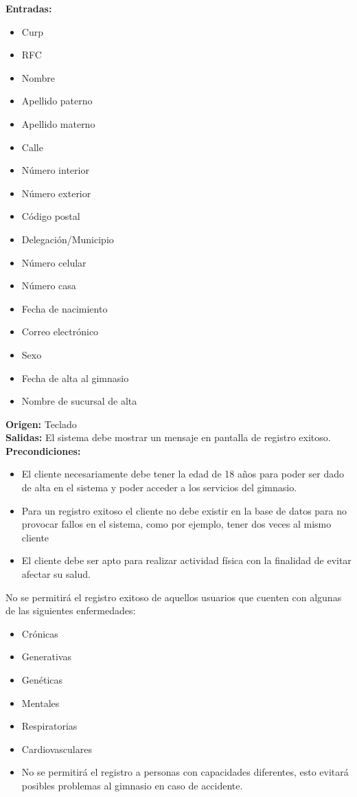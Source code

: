 \textbf{Entradas:}
\begin{itemize}
	\item Curp
	\item RFC
	\item Nombre
	\item Apellido paterno
	\item Apellido materno
	\item Calle 
	\item Número interior
	\item Número exterior
	\item Código postal
	\item Delegación/Municipio
	\item Número celular
	\item Número casa
	\item Fecha de nacimiento
	\item Correo electrónico
	\item Sexo
	\item Fecha de alta al gimnasio
	\item Nombre de sucursal de alta 
\end{itemize}
\textbf{Origen:} Teclado\\
\textbf{Salidas:} El sistema debe mostrar un mensaje en pantalla de registro exitoso.\\
\textbf{Precondiciones:}
\begin{itemize}
	\item El cliente necesariamente debe tener la edad de 18 años para poder ser dado de alta en el sistema y poder acceder a los servicios del gimnasio.
	\item Para un registro exitoso el cliente no debe existir en la base de datos para no provocar fallos en el sistema, como por ejemplo, tener dos veces al mismo cliente
	\item El cliente debe ser apto para realizar actividad física con la finalidad de evitar  afectar su salud.
\end{itemize}
No se permitirá el registro exitoso de aquellos usuarios que cuenten con algunas de  las siguientes enfermedades: \\
\begin{itemize}
	\item Crónicas
	\item Generativas
	\item Genéticas
	\item Mentales
	\item Respiratorias
	\item Cardiovasculares
	\item No se permitirá el registro a personas con capacidades diferentes, esto evitará posibles problemas al gimnasio en caso de accidente.
\end{itemize}
	
